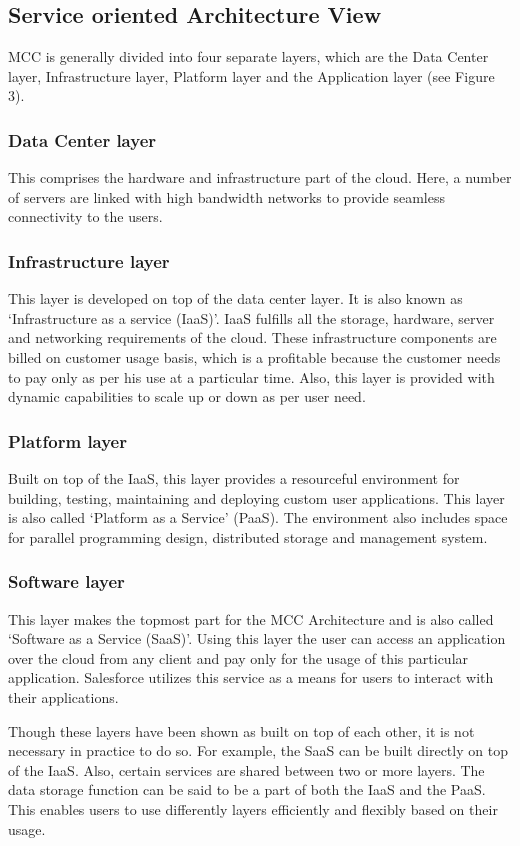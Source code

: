 \documentclass[10pt, conference, compsocconf]{IEEEtran}
\begin{document}
\subsection{Service oriented Architecture View}
MCC is generally divided into four separate layers, which are the Data Center layer, Infrastructure layer, Platform layer and the Application layer (see Figure 3).
\subsubsection{Data Center layer}
This comprises the hardware and infrastructure part of the cloud. Here, a number of servers are linked with high bandwidth networks to provide seamless connectivity to the users.
\subsubsection{Infrastructure layer}
This layer is developed on top of the data center layer. It is also known as `Infrastructure as a service (IaaS)'. IaaS fulfills all the storage, hardware, server and networking requirements of the cloud. These infrastructure components are billed on customer usage basis, which is a profitable because the customer needs to pay only as per his use at a particular time. Also, this layer is provided with dynamic capabilities to scale up or down as per user need.
\subsubsection{Platform layer}
Built on top of the IaaS, this layer provides a resourceful environment for building, testing, maintaining and deploying custom user applications. This layer is also called `Platform as a Service' (PaaS). The environment also includes space for parallel programming design, distributed storage and management system.
\subsubsection{Software layer}
This layer makes the topmost part for the MCC Architecture and is also called `Software as a Service (SaaS)'. Using this layer the user can access an application over the cloud from any client and pay only for the usage of this particular application. Salesforce utilizes this service as a means for users to interact with their applications.


Though these layers have been shown as built on top of each other, it is not necessary in practice to do so. For example, the SaaS can be built directly on top of the IaaS. Also, certain services are shared between two or more layers. The data storage function can be said to be a part of both the IaaS and the PaaS. This enables users to use differently layers efficiently and flexibly based on their usage.
\end{document}

